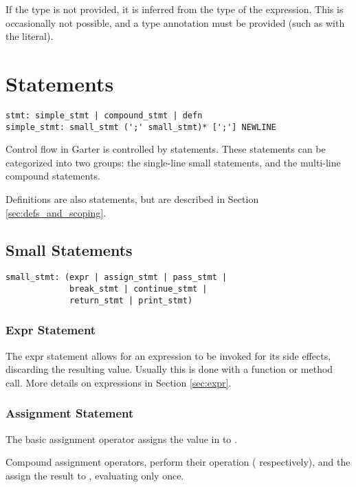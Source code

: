 If the type is not provided, it is inferred from the type of the expression. This is
occasionally not possible, and a type annotation must be provided (such as with the
 literal).

\section{Statements}

\begin{lstlisting}
stmt: simple_stmt | compound_stmt | defn
simple_stmt: small_stmt (';' small_stmt)* [';'] NEWLINE
\end{lstlisting}

Control flow in Garter is controlled by statements. These statements can be
categorized into two groups: the single-line small statements, and the
multi-line compound statements.

Definitions are also statements, but are described in Section
\ref{sec:defs_and_scoping}.

\subsection{Small Statements}

\begin{lstlisting}
small_stmt: (expr | assign_stmt | pass_stmt |
             break_stmt | continue_stmt |
             return_stmt | print_stmt)
\end{lstlisting}

\subsubsection{Expr Statement}

The expr statement allows for an expression to be invoked for its side effects,
discarding the resulting value. Usually this is done with a function or method
call. More details on expressions in Section \ref{sec:expr}.

\subsubsection{Assignment Statement}

The basic assignment operator  assigns the value in 
to .

Compound assignment operators, \code{+= -= *= /= \%= **= //=} perform their
operation (\code{+ - * / \% ** //} respectively), and the assign the result to
, evaluating  only once.

